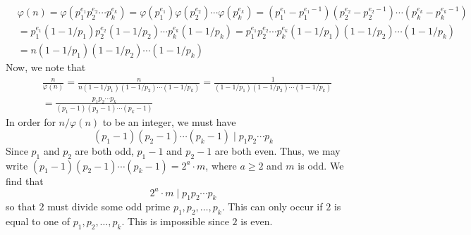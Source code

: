 \documentclass[12pt]{article}
\begin{document}
\begin{align*}
& \varphi(n) = \varphi(p_1^{e_1} p_2^{e_2} \cdots p_k^{e_k}) = \varphi(p_1^{e_1}) \varphi(p_2^{e_2}) \cdots \varphi(p_k^{e_k}) = (p_1^{e_1} - p_1^{e_1 - 1})(p_2^{e_2} - p_2^{e_2-1})\cdots (p_k^{e_k} - p_k^{e_k - 1})\\
& = p_1^{e_1}(1-1/p_1)p_2^{e_2}(1-1/p_2) \cdots p_k^{e_k}(1-1/p_k) = p_1^{e_1} p_2^{e_2} \cdots p_k^{e_k} (1-1/p_1)(1-1/p_2)\cdots(1 - 1/p_k) \\
&= n (1-1/p_1)(1-1/p_2)\cdots(1 - 1/p_k)
\end{align*} Now, we note that
\begin{align*}
&\frac{n}{\varphi(n)} = \frac{n}{n (1-1/p_1)(1-1/p_2)\cdots(1 - 1/p_k)} = \frac{1}{(1-1/p_1)(1-1/p_2)\cdots(1 - 1/p_k)} \\
&= \frac{p_1p_2\cdots p_k}{(p_1 - 1)(p_2 - 1)\cdots(p_k - 1)}
\end{align*} 
In order for $n/ \varphi(n)$ to be an integer, we must have
\[
(p_1 - 1)(p_2 - 1) \cdots (p_k - 1) \mid p_1 p_2 \cdots p_k
\] Since $p_1$ and $p_2$ are both odd, $p_1 - 1$ and $p_2 - 1$ are both even. Thus, we may write $(p_1-1)(p_2 - 1) \cdots (p_k - 1) = 2^a \cdot m$, where $a \geq 2$ and $m$ is odd. We find that
\[
2^a \cdot m \mid p_1 p_2 \cdots p_k
\] so that $2$ must divide some odd prime $p_1,p_2,\ldots,p_k$. This can only occur if $2$ is equal to one of $p_1,p_2,\ldots,p_k$. This is impossible since $2$ is even.
\end{document}

